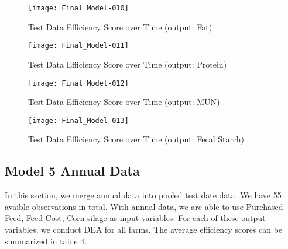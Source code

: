 \documentclass[12pt,]{article}
\begin{document}
\begin{figure}[H]
\texttt{[image: Final\_Model-010]}
\caption{Test Data Efficiency Score over Time (output: Fat)}
\end{figure}
\begin{figure}[H]
\texttt{[image: Final\_Model-011]}
\caption{Test Data Efficiency Score over Time (output: Protein)}
\end{figure}
\begin{figure}[H]
\texttt{[image: Final\_Model-012]}
\caption{Test Data Efficiency Score over Time (output: MUN)}
\end{figure}
\begin{figure}[H]
\texttt{[image: Final\_Model-013]}
\caption{Test Data Efficiency Score over Time (output: Fecal Starch)}
\end{figure}

\subsection{Model 5 Annual Data}
In this section, we merge annual data into pooled test date data. We have 55 avaible observations in total. With annual data, we are able to use Purchased Feed, Feed Cost, Corn silage as input variables. For each of these output variables, we conduct DEA for all farms. The average efficiency scores can be summarized in table 4.
\end{document}
